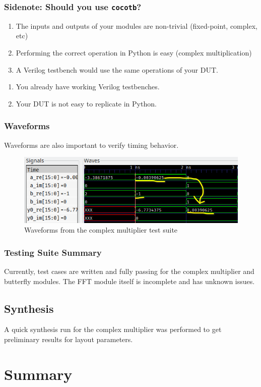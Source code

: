 \documentclass{beamer}
\begin{document}
\begin{frame}
	\frametitle{Sidenote: Should you use \texttt{cocotb}?}
	\begin{enumerate}
		\item The inputs and outputs of your modules are 
			non-trivial (fixed-point, complex, etc)
		\item Performing the correct operation in 
			Python is easy (complex multiplication)
		\item A Verilog testbench would use the 
			same operations of your DUT.
	\end{enumerate}

	\begin{enumerate}
		\item You already have working Verilog testbenches.
		\item Your DUT is not easy to replicate in Python.
	\end{enumerate}
\end{frame}

\begin{frame}
	\frametitle{Waveforms}
	Waveforms are also important to verify timing behavior.
	\begin{figure}
		\includegraphics[width=\linewidth]{./../first_report/figures/cplx_mul_waveform.png}
		\caption{Waveforms from the complex multiplier test suite}
		\centering
	\end{figure}
\end{frame}

\begin{frame}
	\frametitle{Testing Suite Summary}
	Currently, test cases are written and fully passing for the complex multiplier
	and butterfly modules. The FFT module itself is incomplete and has unknown issues.
\end{frame}

\subsection{Synthesis}
A quick synthesis run for the complex multiplier was performed to get preliminary results
for layout parameters.

\section{Summary}
\end{document}
